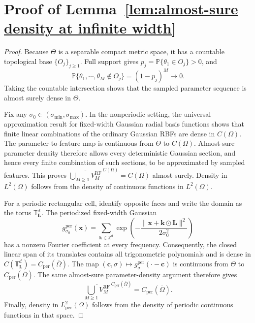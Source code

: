 \documentclass[10pt,reqno]{amsart}
\theoremstyle{remark}
\theoremstyle{definition}
\begin{document}
\section{Proof of Lemma~\ref{lem:almost-sure density at infinite width}}
\label{sec:pf:lem:almost-sure density at infinite width}
\begin{proof}
  Because $\Theta$ is a separable compact metric space, it has a countable topological base $\{O_j\}_{j\ge1}$. Full support gives $p_j=\mathbb P\{\theta_1\in O_j\}>0$, and
  $$\mathbb P\{\theta_1,\cdots,\theta_M\notin O_j\}=(1-p_j)^M \longrightarrow 0.$$
  Taking the countable intersection shows that the sampled parameter sequence is almost surely dense in $\Theta$.

  Fix any $\sigma_0\in(\sigma_{\min},\sigma_{\max})$. In the nonperiodic setting, the universal approximation result for fixed-width Gaussian radial basis functions \cite{PARKSANDBERG1991246} shows that finite linear combinations of the ordinary Gaussian RBFs are dense in $C(\Omega)$. The parameter-to-feature map is continuous from $\Theta$ to $C(\Omega)$. Almost-sure parameter density therefore allows every deterministic Gaussian section, and hence every finite combination of such sections, to be approximated by sampled features. This proves $\overline{\bigcup_{M\ge1}V_M^{\mathrm{RF}}}^{\,C(\Omega)}=C(\Omega)$ almost surely. Density in $L^2(\Omega)$ follows from the density of continuous functions in $L^2(\Omega)$.

  For a periodic rectangular cell, identify opposite faces and write the domain as the torus $\mathbb T_{\boldsymbol L}^d$. The periodized fixed-width Gaussian
  $$
  g_{\sigma_0}^{\mathrm{per}}(\boldsymbol x)=\sum_{\boldsymbol k\in\mathbb Z^d}\exp\left(-\frac{\|\boldsymbol x+\boldsymbol k\odot\boldsymbol L\|^2}{2\sigma_0^2}\right)
  $$
  has a nonzero Fourier coefficient at every frequency. Consequently, the closed linear span of its translates contains all trigonometric polynomials and is dense in $C(\mathbb T_{\boldsymbol L}^d)=C_{\mathrm{per}}(\overline\Omega)$. The map $(\boldsymbol c,\sigma)\mapsto g_\sigma^{\mathrm{per}}(\cdot-\boldsymbol c)$ is continuous from $\Theta$ to $C_{\mathrm{per}}(\overline\Omega)$. The same almost-sure parameter-density argument therefore gives
  $$
  \overline{\bigcup_{M\ge1}V_M^{\mathrm{RF}}}^{\,C_{\mathrm{per}}(\overline\Omega)}=C_{\mathrm{per}}(\overline\Omega).
  $$
  Finally, density in $L^2_{\mathrm{per}}(\Omega)$ follows from the density of periodic continuous functions in that space.
\end{proof}
\end{document}
